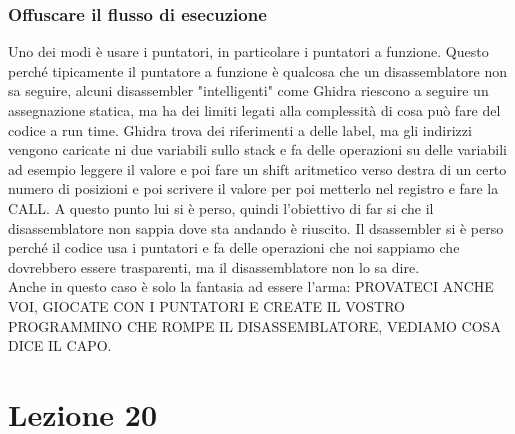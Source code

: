 \documentclass[12pt, oneside]{extbook}
\begin{document}
\subsection{Offuscare il flusso di esecuzione}
Uno dei modi è usare i puntatori, in particolare i puntatori a funzione. Questo perché tipicamente il puntatore a funzione è qualcosa che un disassemblatore non sa seguire, alcuni disassembler "intelligenti" come Ghidra riescono a seguire un assegnazione statica, ma ha dei limiti legati alla complessità di cosa può fare del codice a run time. Ghidra trova dei riferimenti a delle label, ma gli indirizzi vengono caricate ni due variabili sullo stack e fa delle operazioni su delle variabili ad esempio leggere il valore e poi fare un shift aritmetico verso destra di un certo numero di posizioni e poi scrivere il valore per poi metterlo nel registro e fare la CALL. A questo punto lui si è perso, quindi l'obiettivo di far si che il disassemblatore non sappia dove sta andando è riuscito. Il dsassembler si è perso perché il codice usa i puntatori e fa delle operazioni che noi sappiamo che dovrebbero essere trasparenti, ma il disassemblatore non lo sa dire.\\Anche in questo caso è solo la fantasia ad essere l'arma: PROVATECI ANCHE VOI, GIOCATE CON I PUNTATORI E CREATE IL VOSTRO PROGRAMMINO CHE ROMPE IL DISASSEMBLATORE, VEDIAMO COSA DICE IL CAPO.
\chapter{Lezione 20}
\end{document}
